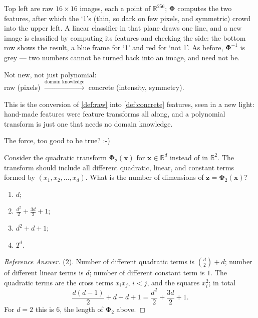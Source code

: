 Top left are raw \(16 \times 16\) images, each a point of \(\mathbb{R}^{256}\);
\(\bm{\Phi}\) computes the two features, after which the `1's (thin, so dark
on few pixels, and symmetric) crowd into the upper left. A linear
classifier in that plane draws one line, and a new image is classified by
computing its features and checking the side: the bottom row shows the result,
a blue frame for `1' and red for `not 1'. As before, \(\bm{\Phi}^{-1}\) is
grey --- two numbers cannot be turned back into an image, and need not be.

\begin{moral}
    Not new, not just polynomial:\\
    \null\hfill raw (pixels) \(\xrightarrow{\text{domain knowledge}}\)
    concrete (intensity, symmetry).\hfill\null
\end{moral}

This is the conversion of \autoref{def:raw} into \autoref{def:concrete}
features, seen in a new light: hand-made features were feature transforms all
along, and a polynomial transform is just one that needs no domain knowledge.

\begin{question}
    The force, too good to be true? :-)
\end{question}

\begin{exercise}
    Consider the quadratic transform \(\bm{\Phi}_2(\bm{x})\) for \(\bm{x} \in
    \mathbb{R}^d\) instead of in \(\mathbb{R}^2\). The transform should include
    all different quadratic, linear, and constant terms formed by \((x_1, x_2,
    \dots, x_d)\). What is the number of dimensions of \(\bm{z} =
    \bm{\Phi}_2(\bm{x})\)?
    \begin{enumerate}[(1)]
        \item \(d\);
        \item \(\frac{d^2}{2} + \frac{3d}{2} + 1\);
        \item \(d^2 + d + 1\);
        \item \(2^d\).
    \end{enumerate}
\end{exercise}

\begin{proof}[Reference Answer]
    (2). Number of different quadratic terms is \(\binom{d}{2} + d\); number of
    different linear terms is \(d\); number of different constant term is
    \(1\). The quadratic terms are the cross terms \(x_i x_j\), \(i < j\), and
    the squares \(x_i^2\); in total
    \[
        \frac{d(d-1)}{2} + d + d + 1 = \frac{d^2}{2} + \frac{3d}{2} + 1 .
    \]
    For \(d = 2\) this is \(6\), the length of \(\bm{\Phi}_2\) above.
\end{proof}

